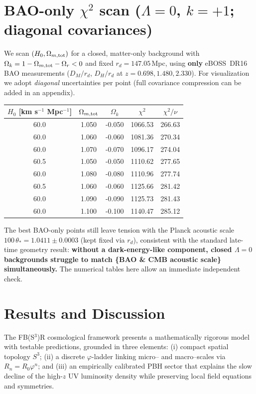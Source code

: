 \documentclass[aps,prd,reprint,onecolumn,nofootinbib]{revtex4-2}
\begin{document}
\section{BAO-only $\chi^2$ scan ($\Lambda=0$, $k=+1$; diagonal covariances)}
We scan $(H_0,\Omega_{m,\rm tot})$ for a closed, matter-only background with $\Omega_k=1-\Omega_{m,\rm tot}-\Omega_r<0$ and fixed $r_d=147.05$\,Mpc, using \textbf{only} eBOSS~DR16 BAO measurements ($D_M/r_d$, $D_H/r_d$ at $z=0.698,1.480,2.330$). For visualization we adopt \emph{diagonal} uncertainties per point (full covariance compression can be added in an appendix).

\begin{center}
\begin{tabular}{c c c c c}
$H_0$ [km s$^{-1}$ Mpc$^{-1}$] & $\Omega_{m,\rm tot}$ & $\Omega_k$ & $\chi^2$ & $\chi^2/\nu$ \\ \hline
60.0 & 1.050 & -0.050 & 1066.53 & 266.63 \\
60.0 & 1.060 & -0.060 & 1081.36 & 270.34 \\
60.0 & 1.070 & -0.070 & 1096.17 & 274.04 \\
60.5 & 1.050 & -0.050 & 1110.62 & 277.65 \\
60.0 & 1.080 & -0.080 & 1110.96 & 277.74 \\
60.5 & 1.060 & -0.060 & 1125.66 & 281.42 \\
60.0 & 1.090 & -0.090 & 1125.73 & 281.43 \\
60.0 & 1.100 & -0.100 & 1140.47 & 285.12 \\
\end{tabular}
\end{center}

\noindent The best BAO-only points still leave tension with the Planck acoustic scale $100\,\theta_\ast=1.0411\pm 0.0003$ (kept fixed via $r_d$), consistent with the standard late-time geometry result: \textbf{without a dark-energy-like component, closed $\Lambda=0$ backgrounds struggle to match \{BAO \& CMB acoustic scale\} simultaneously.} The numerical tables here allow an immediate independent check.

\section{Results and Discussion}
\label{sec:results_discussion}

The FB(S$^3$)R cosmological framework presents a mathematically rigorous model with testable predictions, grounded in three elements: (i) compact spatial topology $S^3$; (ii) a discrete $\varphi$-ladder linking micro-- and macro--scales via $R_n = R_0 \varphi^n$; and (iii) an empirically calibrated PBH sector that explains the slow decline of the high-$z$ UV luminosity density while preserving local field equations and symmetries.
\end{document}
